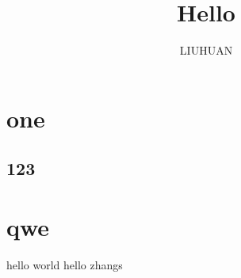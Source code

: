 \documentclass[12pt]{article}
\begin{document}
\author{LIUHUAN}
\title{Hello }
\maketitle
    \section{one}
    	\subsection{123}
	\section{qwe}
	hello world
hello
zhangs

	
     
        
\end{document}
